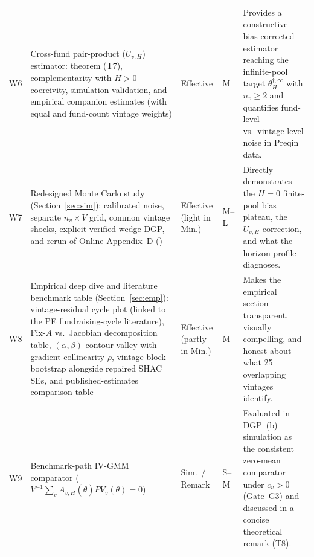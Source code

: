 \documentclass[11pt]{article}
\newcommand{\code}[1]{\texttt{\detokenize{#1}}}
\begin{document}
{\begin{longtable}{@{}L{0.8cm}L{5.5cm}L{1.4cm}L{1.0cm}L{6.4cm}@{}}
W6 & Cross-fund pair-product ($U_{v,H}$) estimator: theorem (T7), complementarity with $H>0$ coercivity, simulation validation, and empirical companion estimates (with equal and fund-count vintage weights) & Effective & M & Provides a constructive bias-corrected estimator reaching the infinite-pool target $\theta_H^{\dagger,\infty}$ with $n_v\ge 2$ and quantifies fund-level vs.\ vintage-level noise in Preqin data.\\
W7 & Redesigned Monte Carlo study (Section~\ref{sec:sim}): calibrated noise, separate $n_v\times V$ grid, common vintage shocks, explicit verified wedge DGP, and rerun of Online Appendix~D (\code{tab:driessen_comparison}) & Effective (light in Min.) & M--L & Directly demonstrates the $H=0$ finite-pool bias plateau, the $U_{v,H}$ correction, and what the horizon profile diagnoses.\\
W8 & Empirical deep dive and literature benchmark table (Section~\ref{sec:emp}): vintage-residual cycle plot (linked to the PE fundraising-cycle literature), Fix-$A$ vs.\ Jacobian decomposition table, $(\alpha,\beta)$ contour valley with gradient collinearity $\rho$, vintage-block bootstrap alongside repaired SHAC SEs, and published-estimates comparison table & Effective (partly in Min.) & M & Makes the empirical section transparent, visually compelling, and honest about what 25 overlapping vintages identify.\\
W9 & Benchmark-path IV-GMM comparator ($V^{-1}\sum_v A_{v,H}(\bar\theta)PV_v(\theta)=0$) & Sim.\ / Remark & S--M & Evaluated in DGP~(b) simulation as the consistent zero-mean comparator under $c_v>0$ (Gate~G3) and discussed in a concise theoretical remark (T8).\\
\bottomrule
\end{longtable}
}
\end{document}
